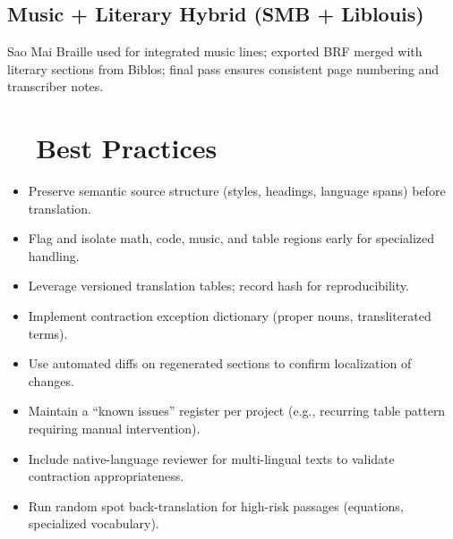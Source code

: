 \subsection*{Music + Literary Hybrid (SMB + Liblouis)}
Sao Mai Braille used for integrated music lines; exported BRF merged with literary sections from Biblos; final pass ensures consistent page numbering and transcriber notes.

\section{~~Best Practices}
\label{sec:braille-best-practices}
\begin{itemize}
	\item Preserve semantic source structure (styles, headings, language spans) before translation.
	\item Flag and isolate math, code, music, and table regions early for specialized handling.
	\item Leverage versioned translation tables; record hash for reproducibility.
	\item Implement contraction exception dictionary (proper nouns, transliterated terms).
	\item Use automated diffs on regenerated sections to confirm localization of changes.
	\item Maintain a “known issues” register per project (e.g., recurring table pattern requiring manual intervention).
	\item Include native-language reviewer for multi-lingual texts to validate contraction appropriateness.
	\item Run random spot back-translation for high-risk passages (equations, specialized vocabulary).
\end{itemize}

